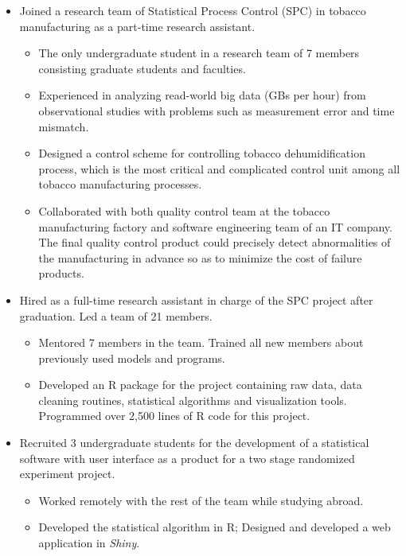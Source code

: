 \documentclass[11pt]{article}
\begin{document}
\begin{itemize}
	\item Joined a research team of Statistical Process Control (SPC) in tobacco manufacturing as a part-time research assistant.
	\begin{itemize}
		\item The only undergraduate student in a research team of 7 members consisting graduate students and faculties.
		\item Experienced in analyzing read-world big data (GBs per hour) from observational studies with problems such as measurement error and time mismatch.
		\item Designed a control scheme for controlling tobacco dehumidification process, which is the most critical and complicated control unit among all tobacco manufacturing processes.
		\item Collaborated with both quality control team at the tobacco manufacturing factory and software engineering team of an IT company. The final quality control product could precisely detect abnormalities of the manufacturing in advance so as to minimize the cost of failure products.
	\end{itemize}

	\item Hired as a full-time research assistant in charge of the SPC project after graduation. Led a team of 21 members.
	\begin{itemize}
		\item Mentored 7 members in the team. Trained all new members about previously used models and programs.
		\item Developed an R package for the project containing raw data, data cleaning routines, statistical algorithms and visualization tools. Programmed over 2,500 lines of R code for this project.
	\end{itemize}

	\item Recruited 3 undergraduate students for the development of a statistical software with user interface as a product for a two stage randomized experiment project.
	\begin{itemize}
		\item Worked remotely with the rest of the team while studying abroad.
		\item Developed the statistical algorithm in R; Designed and developed a web application in \emph{Shiny}.
	\end{itemize}
\end{itemize}
\end{document}
